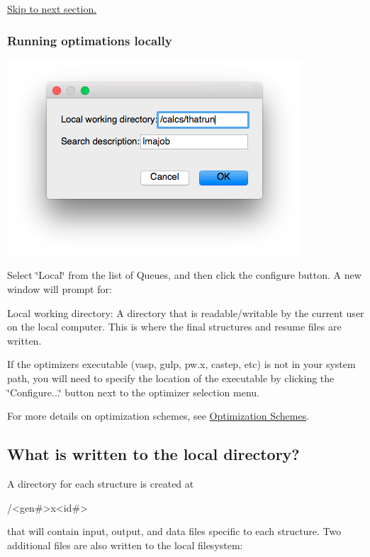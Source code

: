 \hyperlink{tut-xo_files}{Skip to next section.}\hypertarget{tut-xo_localqi}{}\subsubsection{Running optimations locally}\label{tut-xo_localqi}
 
\begin{DoxyImageNoCaption}
  \mbox{\includegraphics[width=.5\textwidth]{opt-set-local.png}}
\end{DoxyImageNoCaption}


Select \char`\"{}\+Local\char`\"{} from the list of Queues, and then click the configure button. A new window will prompt for\+:
\begin{DoxyItemize}
\item Local working directory\+: A directory that is readable/writable by the current user on the local computer. This is where the final structures and resume files are written.
\end{DoxyItemize}

If the optimizer\textquotesingle{}s executable (vasp, gulp, pw.\+x, castep, etc) is not in your system path, you will need to specify the location of the executable by clicking the \char`\"{}\+Configure...\char`\"{} button next to the optimizer selection menu.

For more details on optimization schemes, see \hyperlink{optschemes}{Optimization Schemes}.\hypertarget{tut-xo_files}{}\subsection{What is written to the local directory?}\label{tut-xo_files}
A directory for each structure is created at


\begin{DoxyCode}
/<gen#>x<id#>
\end{DoxyCode}


that will contain input, output, and data files specific to each structure. Two additional files are also written to the local filesystem\+:


